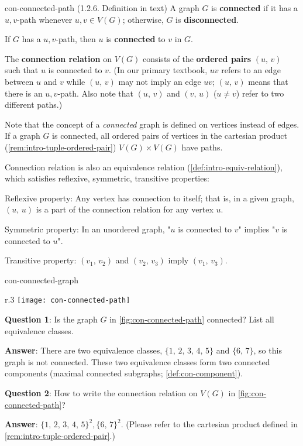 \documentclass[../src/handouts/main.tex]{subfiles}
\begin{document}
\begin{definition}{}{con-connected-path}
  (1.2.6. Definition in text)
  A graph $G$ is \textbf{connected} if it has a $u,v$-path whenever $u,v \in V(G)$; otherwise, $G$ is \textbf{disconnected}.

  If $G$ has a $u,v$-path, then $u$ is \textbf{connected} to $v$ in $G$.

  The \textbf{connection relation} on $V(G)$ consists of the \textbf{ordered pairs} $(u,\, v)$ such that $u$ is connected to $v$. (In our primary textbook, $uv$ refers to an edge between $u$ and $v$ while $(u,\, v)$ may not imply an edge $uv$; $(u,\, v)$ means that there is an $u,v$-path. Also note that $(u,\, v)$ and $(v,\, u)$ ($u \neq v$) refer to two different paths.)
\end{definition}

Note that the concept of a \textit{connected} graph is defined on vertices instead of edges. If a graph $G$ is connected, all ordered pairs of vertices in the cartesian product (\cref{rem:intro-tuple-ordered-pair}) $V(G) \times V(G)$ have paths.

Connection relation is also an equivalence relation (\cref{def:intro-equiv-relation}), which satisfies reflexive, symmetric, transitive properties:
\begin{enumerate*}
  \item Reflexive property: Any vertex has connection to itself; that is, in a given graph, $(u,\, u)$ is a part of the connection relation for any vertex $u$.
  \item Symmetric property: In an unordered graph, "$u$ is connected to $v$" implies "$v$ is connected to $u$".
  \item Transitive property: $(v_1,\, v_2)$ and $(v_2,\, v_3)$ imply $(v_1,\, v_3)$.
\end{enumerate*}

\begin{example}{}{con-connected-graph}
  \begin{wrapfigure}{r}{.3\textwidth}
    \centering
    \texttt{[image: con-connected-path]}
    \caption{A graph $G$ to illustrate connection relation.}
    \label{fig:con-connected-path}
  \end{wrapfigure}

  \textbf{Question 1}: Is the graph $G$ in \cref{fig:con-connected-path} connected? List all equivalence classes.

  \textbf{Answer}: There are two equivalence classes, $\{1,\, 2,\, 3,\, 4,\, 5\}$ and $\{6,\, 7\}$, so this graph is not connected. These two equivalence classes form two connected components (maximal connected subgraphs; \cref{def:con-component}).

  \textbf{Question 2}: How to write the connection relation on $V(G)$ in \cref{fig:con-connected-path}?

  \textbf{Answer}: $\{ 1,\, 2,\, 3,\, 4,\, 5 \}^2, \{ 6,\, 7 \}^2$. (Please refer to the cartesian product defined in \cref{rem:intro-tuple-ordered-pair}.)
\end{example}
\end{document}
